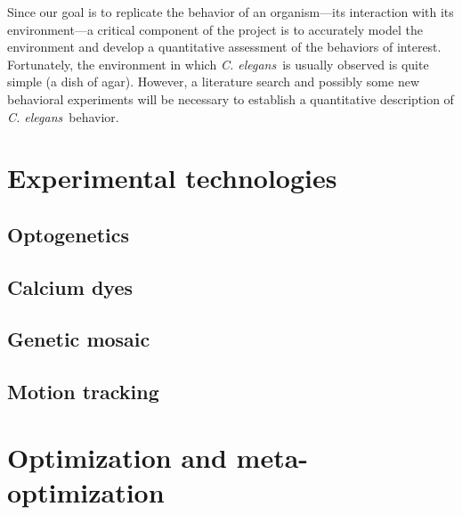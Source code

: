 \documentclass[letter,11pt]{article}
\newcommand{\cel}{{\em C. elegans}}
\begin{document}
Since our goal is to replicate the behavior of an organism---its interaction with
its environment---a critical component of the project is to accurately model the
environment and develop a quantitative assessment of the behaviors of interest.
Fortunately, the environment in which \cel\ is usually observed is quite simple
(a dish of agar). However, a literature search and possibly some new behavioral
experiments will be necessary to establish a quantitative description of \cel\ 
behavior.

\section*{Experimental technologies}

\subsection*{Optogenetics}

\subsection*{Calcium dyes}

\subsection*{Genetic mosaic}

\subsection*{Motion tracking}

\section*{Optimization and meta-optimization}
\end{document}
